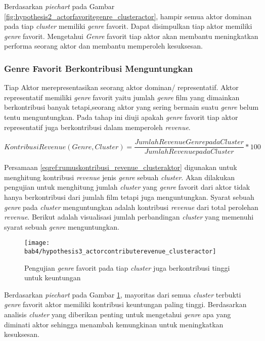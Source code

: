 Berdasarkan \textit{piechart} pada Gambar \ref{fig:hypothesis2_actorfavoritegenre_clusteractor}, hampir semua aktor dominan pada tiap \textit{cluster} memiliki \textit{genre} favorit. Dapat disimpulkan tiap aktor memiliki \textit{genre} favorit. Mengetahui  \textit{Genre} favorit tiap aktor akan membantu meningkatkan performa seorang aktor dan membantu memperoleh kesuksesan. 


\subsubsection{Genre Favorit Berkontribusi Menguntungkan}
Tiap Aktor merepresentasikan seorang aktor dominan/ representatif. Aktor representatif memiliki \textit{genre} favorit yaitu jumlah \textit{genre} film yang dimainkan berkontribusi banyak tetapi,seorang aktor yang sering bermain suatu \textit{genre} belum tentu menguntungkan. Pada tahap ini diuji apakah \textit{genre} favorit tiap aktor representatif juga berkontribusi dalam memperoleh \textit{revenue}. 

\begin{equation}
Kontribusi Revenue(Genre,Cluster) = \frac{Jumlah Revenue Genre pada Cluster}{Jumlah Revenue pada Cluster} * 100 
\label{eqref:rumuskontribusi_revenue_clusteraktor}
\end{equation}

Persamaan \ref{eqref:rumuskontribusi_revenue_clusteraktor} digunakan untuk menghitung kontribusi \textit{revenue} jenis \textit{genre} sebuah \textit{cluster}. Akan dilakukan pengujian untuk menghitung jumlah \textit{cluster} yang \textit{genre} favorit dari aktor tidak hanya berkontribusi dari jumlah film tetapi juga menguntungkan. Syarat sebuah \textit{genre} pada \textit{cluster} menguntungkan adalah kontribusi \textit{revenue} dari total perolehan \textit{revenue}. Berikut adalah visualisasi jumlah perbandingan \textit{cluster} yang memenuhi syarat sebuah \textit{genre} menguntungkan.


\begin{figure}[H]
	\centering  
	\texttt{[image: bab4/hypothesis3\_actorcontributerevenue\_clusteractor]}   
	\caption{Pengujian \textit{genre} favorit pada tiap \textit{cluster} juga berkontribusi tinggi untuk keuntungan}	
\label{fig:hypothesis3_actorcontributerevenue_clusteractor} 
\end{figure}

Berdasarkan \textit{piechart} pada Gambar \ref{fig:hypothesis3_actorcontributerevenue_clusteractor}, mayoritas dari semua \textit{cluster} terbukti \textit{genre} favorit aktor memiliki kontribusi keuntungan paling tinggi. Berdasarkan analisis \textit{cluster} yang diberikan penting untuk mengetahui \textit{genre} apa yang diminati aktor sehingga menambah kemungkinan untuk meningkatkan kesuksesan. 


